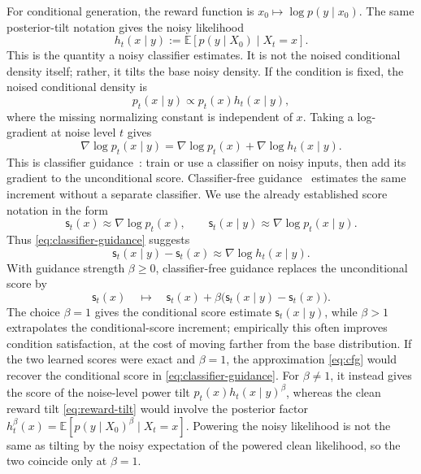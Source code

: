 \documentclass{amsart}
\numberwithin{equation}{section}
\theoremstyle{plain}
\theoremstyle{definition}
\theoremstyle{remark}
\newcommand{\E}{\mathbb{E}}
\newcommand{\score}{\mathsf{s}}
\begin{document}
For conditional generation, the reward function is
$x_0\mapsto\log p(y\mid x_0)$.  The same posterior-tilt notation gives the noisy
likelihood
\[
    h_t(x\mid y)
    :=
    \E[p(y\mid X_0)\mid X_t=x].
\]
This is the quantity a noisy classifier estimates.  It is not the noised
conditional density itself; rather, it tilts the base noisy density.  If
the condition is fixed, the noised conditional density is
\[
    p_t(x\mid y)\propto p_t(x)h_t(x\mid y),
\]
where the missing normalizing constant is independent of $x$.  Taking a
log-gradient at noise level $t$ gives
\begin{equation}\label{eq:classifier-guidance}
    \nabla\log p_t(x\mid y)
    =
    \nabla\log p_t(x)
    +
    \nabla\log h_t(x\mid y).
\end{equation}
This is classifier guidance~\cite{dhariwal2021guidance}: train or use a
classifier on noisy inputs, then add its gradient to the unconditional score.
Classifier-free guidance~\cite{ho2022cfg} estimates the same increment without
a separate classifier.  We use the already established score notation in the
form
\[
    \score_t(x)\approx\nabla\log p_t(x),
    \qquad
    \score_t(x\mid y)\approx\nabla\log p_t(x\mid y).
\]
Thus \eqref{eq:classifier-guidance} suggests
\[
    \score_t(x\mid y)-\score_t(x)
    \approx
    \nabla\log h_t(x\mid y).
\]
With guidance strength $\beta\geq0$, classifier-free guidance replaces the
unconditional score by
\begin{equation}\label{eq:cfg}
    \score_t(x)
    \quad\longmapsto\quad
    \score_t(x)
    +
    \beta\bigl(\score_t(x\mid y)-\score_t(x)\bigr).
\end{equation}
The choice $\beta=1$ gives the conditional score estimate $\score_t(x\mid y)$, while
$\beta>1$ extrapolates the conditional-score increment; empirically this often
improves condition satisfaction, at the cost of moving farther from the base
distribution.
If the two learned scores were exact and $\beta=1$, the approximation \eqref{eq:cfg}
would recover the conditional score in \eqref{eq:classifier-guidance}.  For
$\beta\neq1$, it instead gives the score of the noise-level power tilt
$p_t(x)h_t(x\mid y)^\beta$, whereas the clean reward tilt
\eqref{eq:reward-tilt} would involve the posterior factor
$h_t^\beta(x)=\E[p(y\mid X_0)^\beta\mid X_t=x]$.  Powering the noisy likelihood is
not the same as tilting by the noisy expectation of the powered clean
likelihood, so the two coincide only at $\beta=1$.
\end{document}
